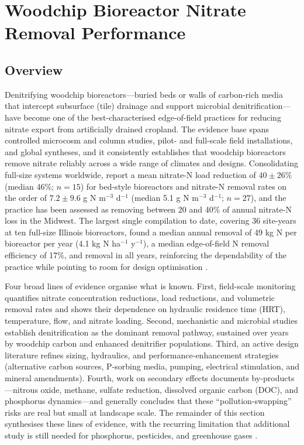 \documentclass[11pt]{article}
\begin{document}
\section*{Woodchip Bioreactor Nitrate Removal Performance}

\subsection{Overview}

Denitrifying woodchip bioreactors---buried beds or walls of carbon-rich media that intercept subsurface (tile) drainage and support microbial denitrification---have become one of the best-characterised edge-of-field practices for reducing nitrate export from artificially drained cropland. The evidence base spans controlled microcosm and column studies, pilot- and full-scale field installations, and global syntheses, and it consistently establishes that woodchip bioreactors remove nitrate reliably across a wide range of climates and designs. Consolidating full-size systems worldwide, \textcite{Christianson2021} report a mean nitrate-N load reduction of $40 \pm 26\%$ (median 46\%; $n=15$) for bed-style bioreactors and nitrate-N removal rates on the order of $7.2 \pm 9.6$ g N m$^{-3}$ d$^{-1}$ (median 5.1 g N m$^{-3}$ d$^{-1}$; $n=27$), and the practice has been assessed as removing between 20 and 40\% of annual nitrate-N loss in the Midwest. The largest single compilation to date, covering 36 site-years at ten full-size Illinois bioreactors, found a median annual removal of 49 kg N per bioreactor per year (4.1 kg N ha$^{-1}$ y$^{-1}$), a median edge-of-field N removal efficiency of 17\%, and removal in all years, reinforcing the dependability of the practice while pointing to room for design optimisation \parencite{Christianson2026}.

Four broad lines of evidence organise what is known. First, field-scale monitoring quantifies nitrate concentration reductions, load reductions, and volumetric removal rates and shows their dependence on hydraulic residence time (HRT), temperature, flow, and nitrate loading. Second, mechanistic and microbial studies establish denitrification as the dominant removal pathway, sustained over years by woodchip carbon and enhanced denitrifier populations. Third, an active design literature refines sizing, hydraulics, and performance-enhancement strategies (alternative carbon sources, P-sorbing media, pumping, electrical stimulation, and mineral amendments). Fourth, work on secondary effects documents by-products---nitrous oxide, methane, sulfate reduction, dissolved organic carbon (DOC), and phosphorus dynamics---and generally concludes that these ``pollution-swapping'' risks are real but small at landscape scale. The remainder of this section synthesises these lines of evidence, with the recurring limitation that additional study is still needed for phosphorus, pesticides, and greenhouse gases \parencite{Mitchell2023}.
\end{document}
